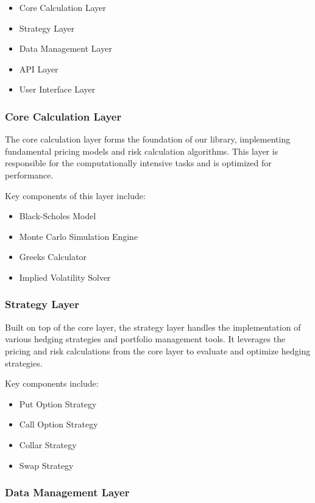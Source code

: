 \documentclass[12pt]{article}
\begin{document}
\begin{itemize}
    \item Core Calculation Layer
    \item Strategy Layer
    \item Data Management Layer
    \item API Layer
    \item User Interface Layer
\end{itemize}

\subsubsection{Core Calculation Layer}

The core calculation layer forms the foundation of our library, implementing fundamental pricing models and risk calculation algorithms. This layer is responsible for the computationally intensive tasks and is optimized for performance.

Key components of this layer include:

\begin{itemize}
    \item Black-Scholes Model
    \item Monte Carlo Simulation Engine
    \item Greeks Calculator
    \item Implied Volatility Solver
\end{itemize}

\subsubsection{Strategy Layer}

Built on top of the core layer, the strategy layer handles the implementation of various hedging strategies and portfolio management tools. It leverages the pricing and risk calculations from the core layer to evaluate and optimize hedging strategies.

Key components include:

\begin{itemize}
    \item Put Option Strategy
    \item Call Option Strategy
    \item Collar Strategy
    \item Swap Strategy
\end{itemize}

\subsubsection{Data Management Layer}
\end{document}
